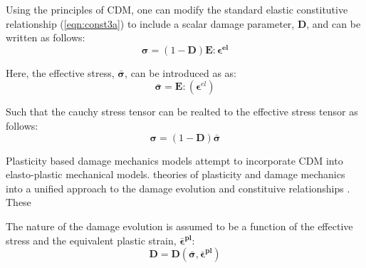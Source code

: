 Using the principles of CDM, one can modify the standard elastic constitutive relationship (\ref{eqn:const3a}) to include a scalar damage parameter, $\mathbf{D}$, and can be written as follows: 
\begin{equation}
\boldsymbol{\sigma}=(1-\mathbf{D})\mathbf{E}:\boldsymbol{\epsilon^{el}}\label{eqn:const3}
\end{equation}

Here, the effective stress, $\boldsymbol{\bar{\sigma}}$, can be introduced as as: 
\begin{equation}
\boldsymbol{\bar{\sigma}}=\mathbf{E}:(\boldsymbol{\epsilon}^{el})\label{eqn:const6}
\end{equation}


Such that the cauchy stress tensor can be realted to the effective
stress tensor as follows: 
\begin{equation}
\boldsymbol{\sigma}=(1-\mathbf{D})\boldsymbol{\bar{\sigma}}\label{eqn:const7}
\end{equation}


Plasticity based damage mechanics models attempt to incorporate CDM into elasto-plastic mechanical models. 
theories of plasticity and damage mechanics into a unified approach to the damage evolution and constituive relationships \cite{zhang_continuum_2010}. These 






The nature of the damage evolution is assumed to be a function of
the effective stress and the equivalent plastic strain, $\boldsymbol{\bar{\epsilon}^{pl}}$:
\begin{equation}
\mathbf{D}=\mathbf{D}(\boldsymbol{\bar{\sigma}},\boldsymbol{\bar{\epsilon}^{pl}})\label{eqn:const8}
\end{equation}